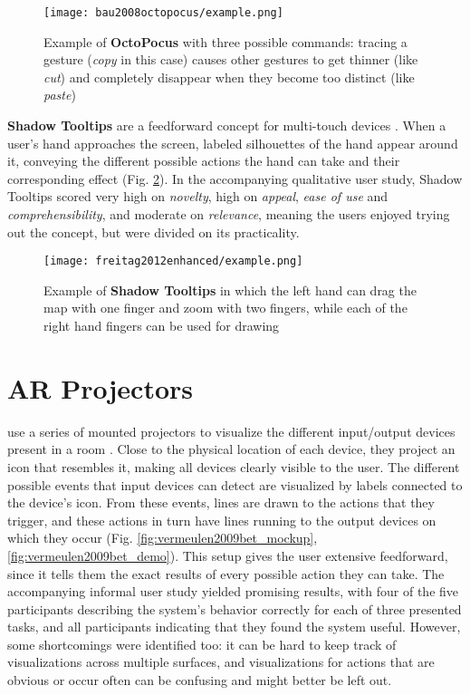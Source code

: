 \begin{figure}
    \centering
    \texttt{[image: bau2008octopocus/example.png]}
    \caption{Example of \textbf{OctoPocus} with three possible commands: tracing a gesture (\textit{copy} in this case) causes other gestures to get thinner (like \textit{cut}) and completely disappear when they become too distinct (like \textit{paste}) \cite{bau2008octopocus}}
    \label{fig:bau2008octopocus_demo}
\end{figure}

\textbf{Shadow Tooltips} are a feedforward concept for multi-touch devices \cite{freitag2012enhanced}. When a user's hand approaches the screen, labeled silhouettes of the hand appear around it, conveying the different possible actions the hand can take and their corresponding effect (Fig. \ref{fig:freitag2012enhanced_demo}). In the accompanying qualitative user study, Shadow Tooltips scored very high on \textit{novelty}, high on \textit{appeal}, \textit{ease of use} and \textit{comprehensibility}, and moderate on \textit{relevance}, meaning the users enjoyed trying out the concept, but were divided on its practicality.


\begin{figure}
    \centering
    \texttt{[image: freitag2012enhanced/example.png]}
    \caption{Example of \textbf{Shadow Tooltips} in which the left hand can drag the map with one finger and zoom with two fingers, while each of the right hand fingers can be used for drawing \cite{freitag2012enhanced}}
    \label{fig:freitag2012enhanced_demo}
\end{figure}

\section{AR Projectors} \label{sec:related_work:ar_projectors}
\textbf{\citeauthor{vermeulen2009bet}} use a series of mounted projectors to visualize the different input/output devices present in a room \cite{vermeulen2009bet}. Close to the physical location of each device, they project an icon that resembles it, making all devices clearly visible to the user. The different possible events that input devices can detect are visualized by labels connected to the device's icon. From these events, lines are drawn to the actions that they trigger, and these actions in turn have lines running to the output devices on which they occur (Fig. \ref{fig:vermeulen2009bet_mockup}, \ref{fig:vermeulen2009bet_demo}). This setup gives the user extensive feedforward, since it tells them the exact results of every possible action they can take. The accompanying informal user study yielded promising results, with four of the five participants describing the system's behavior correctly for each of three presented tasks, and all participants indicating that they found the system useful. However, some shortcomings were identified too: it can be hard to keep track of visualizations across multiple surfaces, and visualizations for actions that are obvious or occur often can be confusing and might better be left out.

